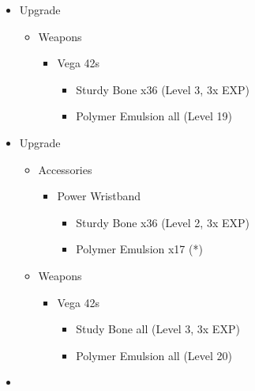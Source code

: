 \begin{paracol}{2}
\begin{upgrade}
\begin{itemize}
		\item Upgrade
		      \begin{itemize}
			      \item Weapons
			            \begin{itemize}
				            \item Vega 42s
				                  \begin{itemize}
					                  \item Sturdy Bone x36 (Level 3, 3x EXP)
					                  \item Polymer Emulsion all (Level 19)
				                  \end{itemize}
			            \end{itemize}
		      \end{itemize}
	\end{itemize}
\end{upgrade}
\switchcolumn
\begin{upgrade}
\begin{itemize}
    \item Upgrade
    \begin{itemize}
        \item Accessories
        \begin{itemize}
            \item Power Wristband
            \begin{itemize}
                \item Sturdy Bone x36 (Level 2, 3x EXP)
                \item Polymer Emulsion x17 (*)
            \end{itemize}
        \end{itemize}
        \item Weapons
        \begin{itemize}
            \item Vega 42s
            \begin{itemize}
                \item Study Bone all (Level 3, 3x EXP)
                \item Polymer Emulsion all (Level 20)
            \end{itemize}
        \end{itemize}
    \end{itemize}
\end{itemize}
\end{upgrade}
\switchcolumn*
\begin{menu}	
		\begin{itemize}
			\paradigm
			\begin{itemize}
				\item {}%
				      {\paradigmline{\rav}{\com}{}}%
				      {\paradigmline[2]{\textit{(\sab)}}{\textit{(\syn)}}{}}%
				      {\paradigmline{\sab}{\syn}{}}%
				      {\paradigmline{\rav}{\rav}{}}%
				      {\paradigmline{[\sab]}{(\rav)}{}}%
				      {\paradigmline{[\sab]}{\com}{}}
			\end{itemize}
			

\end{itemize}
\end{menu}
\end{paracol}
